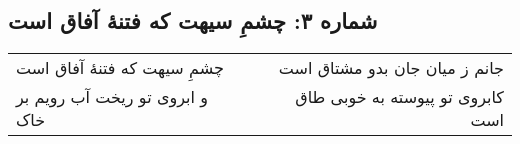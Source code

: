 \begin{center}
\section*{شماره ۳: چشمِ سیهت که فتنۀ آفاق است}
\label{sec:003}
\begin{longtable}{l p{0.5cm} r}
چشمِ سیهت که فتنهٔ آفاق است
&&
جانم ز میان جان بدو مشتاق است
\\
و ابروی تو ریخت آب رویم بر خاک
&&
کابروی تو پیوسته به خوبی طاق است
\\
\end{longtable}
\end{center}
